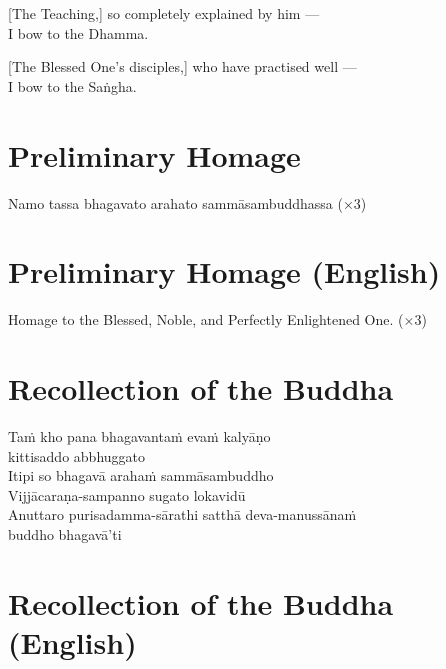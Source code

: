 [The Teaching,] so completely explained by him ---\\
I bow to the Dhamma.

[The Blessed One's disciples,] who have practised well ---\\
I bow to the Saṅgha.

\section*{Preliminary Homage}

\begin{leader}
\end{leader}

Namo tassa bhagavato arahato sammāsambuddhassa (×3)

\section*{Preliminary Homage (English)}

\begin{leader}
\end{leader}

Homage to the Blessed, Noble, and Perfectly Enlightened One. (×3)

\clearpage

\section*{Recollection of the Buddha}

\begin{leader}
\end{leader}

Taṁ kho pana bhagavantaṁ evaṁ kalyāṇo\\
\vin kittisaddo abbhuggato\\
Itipi so bhagavā arahaṁ sammāsambuddho\\
Vijjācaraṇa-sampanno sugato lokavidū\\
Anuttaro purisadamma-sārathi satthā deva-manussānaṁ\\
\vin buddho bhagavā'ti

\section*{Recollection of the Buddha (English)}

